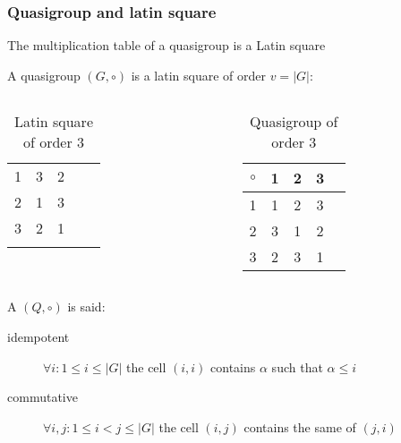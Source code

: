 \begin{frame}
\frametitle{Quasigroup and latin square}

\begin{theorem}
	The multiplication table of a quasigroup is a  Latin square
\end{theorem}
A quasigroup $(G,\circ)$ is a latin square of order $v=|G|$:

	
	\begin{columns}
		\begin{table}[]
			\begin{tabular}{ccccc}
				\cline{1-3}
				\multicolumn{1}{|c|}{1} & \multicolumn{1}{c|}{3} & \multicolumn{1}{c|}{2} &  &  \\ \cline{1-3}
				\multicolumn{1}{|c|}{2} & \multicolumn{1}{c|}{1} & \multicolumn{1}{c|}{3} &  &  \\ \cline{1-3}
				\multicolumn{1}{|c|}{3} & \multicolumn{1}{c|}{2} & \multicolumn{1}{c|}{1} &  &  \\ \cline{1-3}
				\multicolumn{1}{l}{}    & \multicolumn{1}{l}{}   & \multicolumn{1}{l}{}   &  & 
			\end{tabular}
			\caption{Latin square of order $3$}
		\end{table}
		\begin{table}[]
			\begin{tabular}{ccccc}
				$\circ$				   & \multicolumn{1}{|c|}{1} & \multicolumn{1}{c|}{2} & \multicolumn{1}{c|}{3}  \\ \hline
				\multicolumn{1}{c|}{1} & \multicolumn{1}{c|}{1} & \multicolumn{1}{c|}{2} & \multicolumn{1}{c|}{3}  \\ \hline
				\multicolumn{1}{c|}{2} & \multicolumn{1}{c|}{3} & \multicolumn{1}{c|}{1} & \multicolumn{1}{c|}{2}  \\ \hline
				\multicolumn{1}{c|}{3} & \multicolumn{1}{c|}{2} & \multicolumn{1}{c|}{3} & \multicolumn{1}{c|}{1}  \\ \hline
			\end{tabular}
			\caption{Quasigroup of order $3$}
		\end{table}
	\end{columns}
	\pause
	A $(Q,\circ)$ is said:
	\begin{description}%
		\item[idempotent] $\forall i : 1 \le i \le |G|$ the cell $(i,i)$ contains $\alpha$ such that $\alpha \le i$
		\item[commutative] $\forall i,j : 1 \le i<j \le |G|$ the cell $(i,j)$ contains the same of $(j,i)$
	\end{description}

\end{frame}



